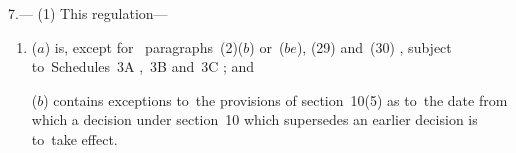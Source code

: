 \documentclass[12pt,a4paper]{article}
\begin{document}
7.—%
%
(1) This regulation---
\begin{enumerate}\item[]


($a$) is, except for~
paragraphs~(2)($b$)
or~($be$), (29) and~(30)%
, subject to~Schedules~3A%
,~3B and~3C%
; and

($b$) contains exceptions to~the provisions of section~10(5) as to~the date from which a decision under section~10 which supersedes an earlier decision is to~take effect.
\end{enumerate}
\end{document}
